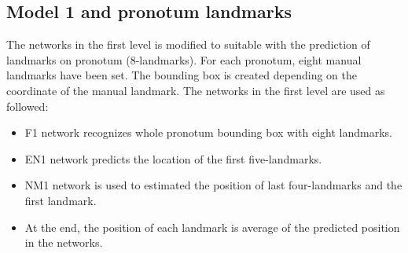 \subsection{Model 1 and pronotum landmarks}
The networks in the first level is modified to suitable with the prediction of landmarks on pronotum (8-landmarks). For each pronotum, eight manual landmarks have been set. The bounding box is created depending on the coordinate of the manual landmark. The networks in the first level are used as followed:
\begin{itemize}
	\item F1 network recognizes whole pronotum bounding box with eight landmarks.
	\item EN1 network predicts the location of the first five-landmarks.
	\item NM1 network is used to estimated the position of last four-landmarks and the first landmark.
	\item At the end, the position of each landmark is average of the predicted position in the networks.
\end{itemize} 
